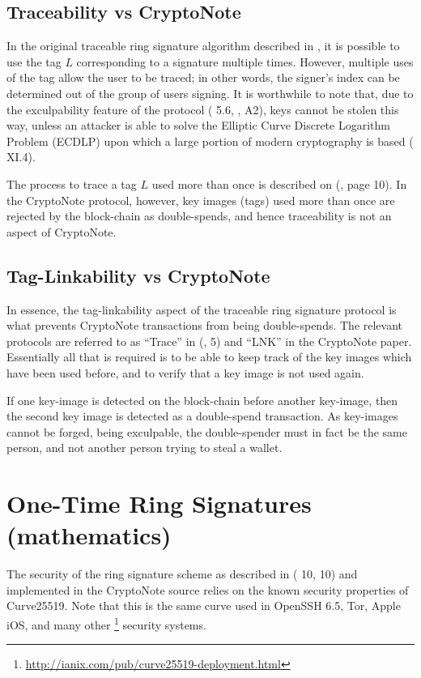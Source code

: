 \documentclass[12pt,english]{mrl}
\numberwithin{equation}{section}
\numberwithin{figure}{section}
\begin{document}
\subsection{Traceability vs CryptoNote}

In the original traceable ring signature algorithm described in \cite{FS},
it is possible to use the tag $L$ corresponding to a signature multiple
times. However, multiple uses of the tag allow the user to be traced;
in other words, the signer's index can be determined out of the group of users
signing. It is worthwhile to note that, due to the exculpability
feature of the protocol (\cite{FS} 5.6, \cite{CN}, A2), keys cannot
be stolen this way, unless an attacker is able to solve the Elliptic
Curve Discrete Logarithm Problem (ECDLP) upon which a large portion of modern
cryptography is based (\cite{Si} XI.4).

The process to trace a tag $L$ used more than once is described
on (\cite{FS}, page 10). In the CryptoNote protocol, however, key
images (tags) used more than once are rejected by the block-chain
as double-spends, and hence traceability is not an aspect of CryptoNote.


\subsection{Tag-Linkability vs CryptoNote}

In essence, the tag-linkability aspect of the traceable ring signature
protocol is what prevents CryptoNote transactions from being double-spends.
The relevant protocols are referred to as ``Trace'' in (\cite{FS},
5) and ``LNK'' in the CryptoNote paper. Essentially all that is
required is to be able to keep track of the key images which have
been used before, and to verify that a key image is not used again. 

If one key-image is detected on the block-chain before
another key-image, then the second key image is detected as a double-spend
transaction. As key-images cannot be forged, being exculpable, the
double-spender must in fact be the same person, and not another person
trying to steal a wallet. 


\section{One-Time Ring Signatures (mathematics)}

The security of the ring signature scheme as described in (\cite{FS}
10, \cite{CN} 10) and implemented in the CryptoNote source relies on the known
security properties of Curve25519. Note that this is the same curve
used in OpenSSH 6.5, Tor, Apple iOS, and many other%
\footnote{\url{http://ianix.com/pub/curve25519-deployment.html}%
} security systems.
\end{document}
